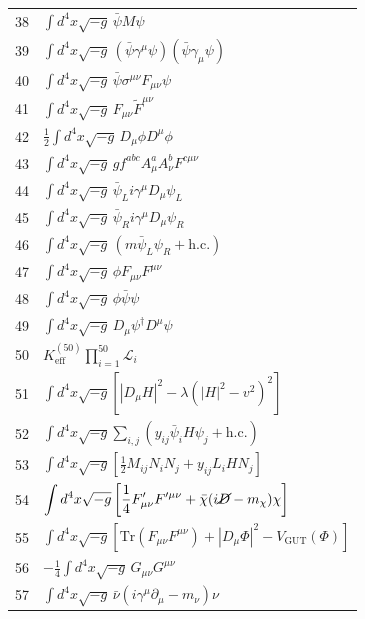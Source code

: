 \documentclass[12pt,a4paper]{article}
\begin{document}
\begin{longtable}{r p{}}
	38 & \(\displaystyle \int d^4x\sqrt{-g}\,\bar\psi M\psi\) \\
	39 & \(\displaystyle \int d^4x\sqrt{-g}\,(\bar\psi\gamma^\mu\psi)(\bar\psi\gamma_\mu\psi)\) \\
	40 & \(\displaystyle \int d^4x\sqrt{-g}\,\bar\psi\sigma^{\mu\nu}F_{\mu\nu}\psi\) \\
	41 & \(\displaystyle \int d^4x\sqrt{-g}\,F_{\mu\nu}\tilde{F}^{\mu\nu}\) \\
	42 & \(\displaystyle \frac12\int d^4x\sqrt{-g}\,D_\mu\phi D^\mu\phi\) \\
	43 & \(\displaystyle \int d^4x\sqrt{-g}\,g f^{abc}A^a_\mu A^b_\nu F^{c\mu\nu}\) \\
	44 & \(\displaystyle \int d^4x\sqrt{-g}\,\bar\psi_L i\gamma^\mu D_\mu\psi_L\) \\
	45 & \(\displaystyle \int d^4x\sqrt{-g}\,\bar\psi_R i\gamma^\mu D_\mu\psi_R\) \\
	46 & \(\displaystyle \int d^4x\sqrt{-g}\,(m\bar\psi_L\psi_R + \text{h.c.})\) \\
	47 & \(\displaystyle \int d^4x\sqrt{-g}\,\phi F_{\mu\nu}F^{\mu\nu}\) \\
	48 & \(\displaystyle \int d^4x\sqrt{-g}\,\phi\bar\psi\psi\) \\
	49 & \(\displaystyle \int d^4x\sqrt{-g}\,D_\mu\psi^\dagger D^\mu\psi\) \\
	50 & \(\displaystyle K^{(50)}_{\mathrm{eff}}\prod_{i=1}^{50}\mathcal{L}_i\) \\
	51 & \(\displaystyle \int d^4x\sqrt{-g}\left[|D_\mu H|^2 - \lambda(|H|^2 - v^2)^2\right]\) \\
	52 & \(\displaystyle \int d^4x\sqrt{-g}\sum_{i,j}\left(y_{ij}\bar\psi_i H\psi_j + \text{h.c.}\right)\) \\
	53 & \(\displaystyle \int d^4x\sqrt{-g}\left[\frac12 M_{ij}N_i N_j + y_{ij}L_i H N_j\right]\) \\
	54 & \(\displaystyle \int d^4x\sqrt{-g}\left[\frac14 F'_{\mu\nu}F'^{\mu\nu} + \bar\chi(i\cancel{D} - m_\chi)\chi\right]\) \\
	55 & \(\displaystyle \int d^4x\sqrt{-g}\left[\mathrm{Tr}(F_{\mu\nu}F^{\mu\nu}) + |D_\mu\Phi|^2 - V_{\text{GUT}}(\Phi)\right]\) \\
	56 & \(\displaystyle -\frac14\int d^4x\sqrt{-g}\,G_{\mu\nu}G^{\mu\nu}\) \\
	57 & \(\displaystyle \int d^4x\sqrt{-g}\,\bar\nu(i\gamma^\mu\partial_\mu - m_\nu)\nu\) \\

\end{longtable}
\end{document}
